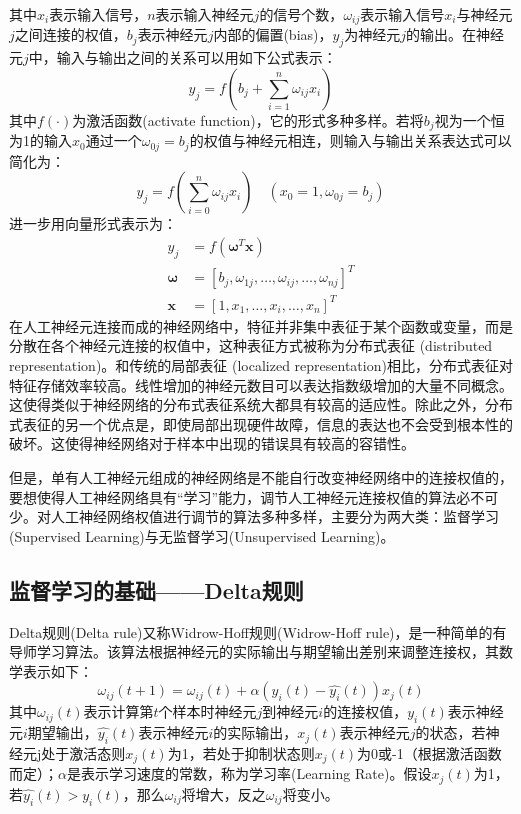 \documentclass[a4paper]{ctexart}
\begin{document}
\begin{spacing}{1.3}
\begin{figure}[htbp]
	\end{figure}\newline
	其中$x_i$表示输入信号，$n$表示输入神经元$j$的信号个数，$\omega_{ij}$表示输入信号$x_i$与神经元$j$之间连接的权值，$b_j$表示神经元$j$内部的偏置(bias)，$y_j$为神经元$j$的输出。在神经元$j$中，输入与输出之间的关系可以用如下公式表示：
	\begin{equation}
		y_j=f\left(b_j+\sum_{i=1}^n\omega_{ij}x_i\right)
	\end{equation}
	其中$f(\cdot)$为激活函数(activate function)，它的形式多种多样。若将$b_j$视为一个恒为1的输入$x_0$通过一个$\omega_{0j}=b_j$的权值与神经元相连，则输入与输出关系表达式可以简化为：
	\begin{equation}
		y_j=f\left(\sum_{i=0}^n\omega_{ij}x_i\right)\quad(x_0=1,\omega_{0j}=b_j)
	\end{equation}
	进一步用向量形式表示为：
	\begin{equation}
		\begin{split}
			y_j&=f\left(\bm{\omega}^T\bm{x}\right)\\
			\bm{\omega}&=\left[b_j,\omega_{1j},\dots,\omega_{ij},\dots,\omega_{nj}\right]^T\\
			\bm{x}&=\left[1,x_1,\dots,x_i,\dots,x_n\right]^T
		\end{split}
	\end{equation}
	在人工神经元连接而成的神经网络中，特征并非集中表征于某个函数或变量，而是分散在各个神经元连接的权值中，这种表征方式被称为分布式表征 (distributed representation)\cite{RN123}。和传统的局部表征 (localized representation)相比，分布式表征对特征存储效率较高。线性增加的神经元数目可以表达指数级增加的大量不同概念。这使得类似于神经网络的分布式表征系统大都具有较高的适应性。除此之外，分布式表征的另一个优点是，即使局部出现硬件故障，信息的表达也不会受到根本性的破坏。这使得神经网络对于样本中出现的错误具有较高的容错性。

	但是，单有人工神经元组成的神经网络是不能自行改变神经网络中的连接权值的，要想使得人工神经网络具有“学习”能力，调节人工神经元连接权值的算法必不可少。对人工神经网络权值进行调节的算法多种多样，主要分为两大类：监督学习(Supervised Learning)与无监督学习(Unsupervised Learning)。

	\subsection{监督学习的基础——Delta规则}
	Delta规则(Delta rule)又称Widrow-Hoff规则(Widrow-Hoff rule)\cite{RN125}，是一种简单的有导师学习算法。该算法根据神经元的实际输出与期望输出差别来调整连接权，其数学表示如下：
	\begin{equation}
		\omega_{ij}(t+1)=\omega_{ij}(t)+\alpha(y_i(t)-\hat{y_i}(t))x_j(t)
	\end{equation}
	其中$\omega_{ij}(t)$表示计算第$t$个样本时神经元$j$到神经元$i$的连接权值，$y_i(t)$表示神经元$i$期望输出，$\hat{y_i}(t)$表示神经元$i$的实际输出，$x_j(t)$表示神经元$j$的状态，若神经元j处于激活态则$x_j(t)$为1，若处于抑制状态则$x_j(t)$为0或-1（根据激活函数而定）；$\alpha$是表示学习速度的常数，称为学习率(Learning Rate)。假设$x_j(t)$为1，若$\hat{y_i}(t)>y_i(t)$，那么$\omega_{ij}$将增大，反之$\omega_{ij}$将变小。


\end{spacing}
\end{document}
